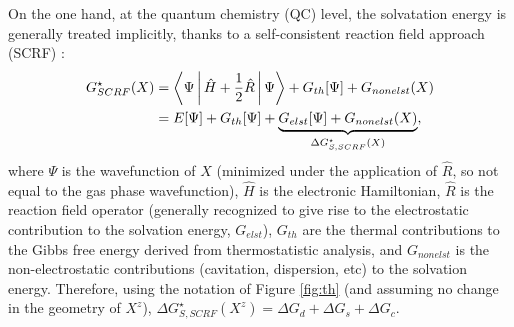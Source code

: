 \documentclass[review,preprint]{elsarticle}
\begin{document}
On the one hand, at the quantum chemistry (QC) level, the solvatation energy is generally treated implicitly, thanks to a self-consistent reaction field approach (SCRF) \cite{herbertDielectricContinuumMethods2021}: \begin{align}
	G^\star_{SCRF}(X) &= \Braket{\Psi|{\hat{H}+\frac{1}{2}\hat{R}}|\Psi} + G_{th}[\Psi] + G_{nonelst}(X) \nonumber\\
	&= E[\Psi] + G_{th}[\Psi] + \underbrace{G_{elst}[\Psi] + G_{nonelst}(X)}_{\Delta G^\star_{S,SCRF}(X)}, \label{eq:scrf}
\end{align}
where $\Psi$ is the wavefunction of $X$ (minimized under the application of $\hat R$, so not equal to the gas phase wavefunction), $\hat H$ is the electronic Hamiltonian, $\hat R$ is the reaction field operator (generally recognized to give rise to the electrostatic contribution to the solvation energy, $G_{elst}$), $G_{th}$ are the thermal contributions to the Gibbs free energy derived from thermostatistic analysis, and $G_{nonelst}$ is the non-electrostatic contributions (cavitation, dispersion, etc) to the solvation energy. Therefore, using the notation of Figure \ref{fig:th} (and assuming no change in the geometry of $X^z$), $ \Delta G^\star_{S,SCRF}(X^z) = \Delta G_d + \Delta G_s + \Delta G_{c}$.  
\end{document}
